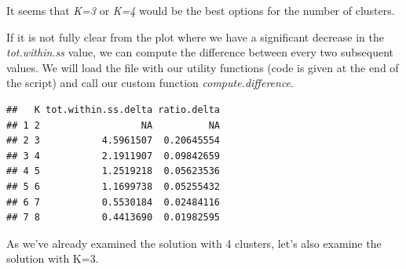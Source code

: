 \documentclass[]{article}
\newenvironment{Shaded}{\begin{snugshade}}{\end{snugshade}}
\newcommand{\KeywordTok}[1]{\textcolor[rgb]{0.13,0.29,0.53}{\textbf{#1}}}
\newcommand{\DataTypeTok}[1]{\textcolor[rgb]{0.13,0.29,0.53}{#1}}
\newcommand{\DecValTok}[1]{\textcolor[rgb]{0.00,0.00,0.81}{#1}}
\newcommand{\StringTok}[1]{\textcolor[rgb]{0.31,0.60,0.02}{#1}}
\newcommand{\CommentTok}[1]{\textcolor[rgb]{0.56,0.35,0.01}{\textit{#1}}}
\newcommand{\OperatorTok}[1]{\textcolor[rgb]{0.81,0.36,0.00}{\textbf{#1}}}
\newcommand{\NormalTok}[1]{#1}
\begin{document}
It seems that \emph{K=3} or \emph{K=4} would be the best options for the
number of clusters.

If it is not fully clear from the plot where we have a significant
decrease in the \emph{tot.within.ss} value, we can compute the
difference between every two subsequent values. We will load the file
with our utility functions (code is given at the end of the script) and
call our custom function \emph{compute.difference}.

\begin{Shaded}
\end{Shaded}

\begin{verbatim}
##   K tot.within.ss.delta ratio.delta
## 1 2                  NA          NA
## 2 3           4.5961507  0.20645554
## 3 4           2.1911907  0.09842659
## 4 5           1.2519218  0.05623536
## 5 6           1.1699738  0.05255432
## 6 7           0.5530184  0.02484116
## 7 8           0.4413690  0.01982595
\end{verbatim}

As we've already examined the solution with 4 clusters, let's also
examine the solution with K=3.

\begin{Shaded}
\end{Shaded}
\end{document}
